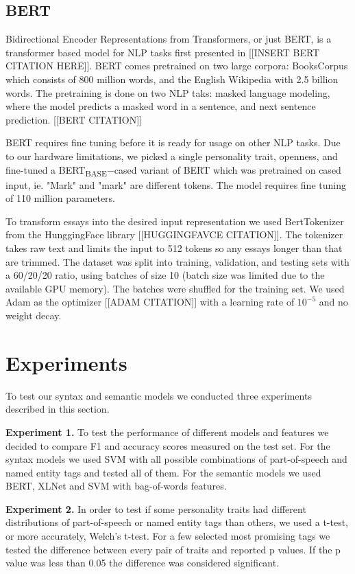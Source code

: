 \documentclass[10pt, a4paper]{article}
\begin{document}
\subsection{BERT}

Bidirectional Encoder Representations from Transformers, or just BERT, is a transformer based model for NLP tasks first presented in [[INSERT BERT CITATION HERE]]. 
BERT comes pretrained on two large corpora: BooksCorpus which consists of 800 million words, and the English Wikipedia with 2.5 billion words. 
The pretraining is done on two NLP taks: masked language modeling, where the model predicts a masked word in a sentence, and next sentence prediction. [[BERT CITATION]]

BERT requires fine tuning before it is ready for usage on other NLP tasks. 
Due to our hardware limitations, we picked a single personality trait, openness, and fine-tuned a BERT\textsubscript{BASE}$-$cased variant of BERT which was pretrained on cased input, ie. "Mark" and "mark" are different tokens. 
The model requires fine tuning of 110 million parameters.

To transform essays into the desired input representation we used BertTokenizer from the HunggingFace library [[HUGGINGFAVCE CITATION]]. 
The tokenizer takes raw text and limits the input to 512 tokens so any essays longer than that are trimmed. 
The dataset was split into training, validation, and testing sets with a 60/20/20 ratio, using batches of size 10 (batch size was limited due to the available GPU memory). 
The batches were shuffled for the training set. We used Adam as the optimizer [[ADAM CITATION]] with a learning rate of $10^{-5}$ and no weight decay.

\section{Experiments}
To test our syntax and semantic models we conducted three experiments described in this section.

\textbf{Experiment 1.} To test the performance of different models and features we decided to compare F1 and accuracy scores measured on the test set.
For the syntax models we used SVM with all possible combinations of part-of-speech and named entity tags and tested all of them.
For the semantic models we used BERT, XLNet and SVM with bag-of-words features.

\textbf{Experiment 2.}  In order to test if some personality traits had different distributions of part-of-speech or named entity tags than others, we used a t-test, or more accurately, Welch’s t-test.
For a few selected most promising tags we tested the difference between every pair of traits and reported p values.
If the p value was less than 0.05 the difference was considered significant.
\end{document}
